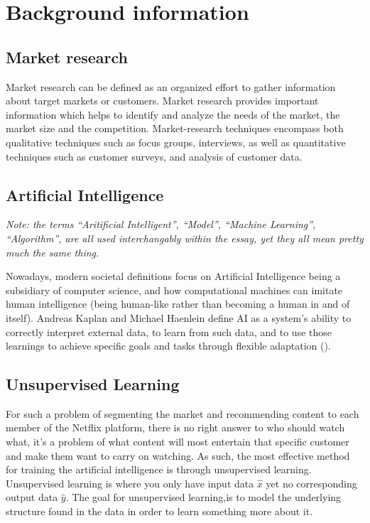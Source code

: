 \documentclass[12pt,a4paper]{article}
\begin{document}
\section{Background information}

\subsection{Market research}
Market research can be defined as an organized effort to gather information about target markets or customers. Market research provides important information which helps to identify and analyze the needs of the market, the market size and the competition. Market-research techniques encompass both qualitative techniques such as focus groups, interviews, as well as quantitative techniques such as customer surveys, and analysis of customer data.

\subsection{Artificial Intelligence}

\textit{Note: the terms \enquote{Aritificial Intelligent}, \enquote{Model}, \enquote{Machine Learning}, \enquote{Algorithm}, are all used interchangably within the essay, yet they all mean pretty much the same thing.}

Nowadays, modern societal definitions focus on Artificial Intelligence being a subsidiary of computer science, and how computational machines can imitate human intelligence (being human-like rather than becoming a human in and of itself). Andreas Kaplan and Michael Haenlein define AI as a system’s ability to correctly interpret external data, to learn from such data, and to use those learnings to achieve specific goals and tasks through flexible adaptation (\cite{kaplan2019siri}).

\subsection{Unsupervised Learning}
For such a problem of segmenting the market and recommending content to each member of the Netflix platform, there is no right answer to who should watch what, it's a problem of what content will most entertain that specific customer and make them want to carry on watching. As such, the most effective method for training the artificial intelligence is through unsupervised learning. Unsupervised learning is where you only have input data \(\hat{x}\) yet no corresponding output data \(\hat{y}\). The goal for unsupervised learning,is to model the underlying structure found in the data in order to learn something more about it.
\end{document}
